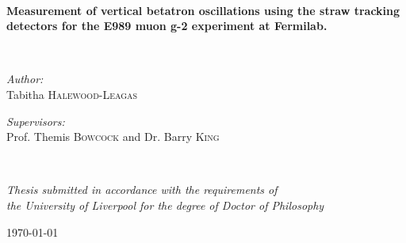 \documentclass[11pt, twoside, english, doublespacing, nolistspacing, headsepline, nohyperref]{MastersDoctoralThesis}
\begin{document}
\frontmatter %

\pagestyle{plain} %


\begin{titlepage}
\begin{center}

\vspace*{.06\textheight}
\HRule \\[0.4cm] %
{\huge \bfseries Measurement of vertical betatron oscillations using the straw tracking detectors for the E989 muon g-2 experiment at Fermilab. \par}\vspace{0.4cm} %
\HRule \\[1.5cm] %
 
\begin{minipage}[t]{0.4\textwidth}
\begin{flushleft} \large
\emph{Author:}\\
Tabitha \textsc{Halewood-Leagas}
\end{flushleft}
\end{minipage}
\begin{minipage}[t]{0.4\textwidth}
\begin{flushright} \large
\emph{Supervisors:} \\
Prof. Themis \textsc{Bowcock} and Dr. Barry \textsc{King} 
\end{flushright}
\end{minipage}\\[3cm]
 
\vfill

\large \textit{Thesis submitted in accordance with the requirements of\\ the University of Liverpool for the degree of Doctor of Philosophy}\\[0.3cm] %

\vfill


{\large \today}\\[3cm] %
 
\vfill
\end{center}
\end{titlepage}
\end{document}
